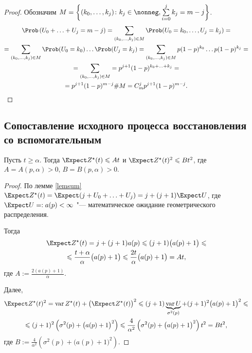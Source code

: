 \begin{proof}
   Обозначим $M = \left\{ (k_0, \ldots, k_j)\colon k_j \in \nonneg, \sum\limits_{i = 0}^j k_j = m - j\right\}$.
  \begin{multline*}
    \Prob\left( U_0 + \ldots + U_j = m - j\right) = \sum_{(k_0, \ldots, k_j) \in M} \Prob(U_0 = k_0, \ldots, U_j = k_j) =\\
    = \sum_{(k_0, \ldots, k_j) \in M} \Prob(U_0 = k_0)\ldots \Prob(U_j = k_j) = \sum_{(k_0, \ldots, k_j) \in M} p (1 - p)^{k_0}\ldots p (1 - p)^{k_j} =\\
    = \sum_{(k_0, \ldots, k_j) \in M} = p^{j + 1} (1 - p)^{k_0 + \ldots + k_j} =\\
    = p^{j + 1} (1 - p)^{m - j} \#M = C_m^j p^{j + 1} (1 - p)^{m - j}.
  \end{multline*}
\end{proof}

\subsection{Сопоставление исходного процесса восстановления со вспомогательным}

\begin{lem}\label{est}
  Пусть $t \geqslant \alpha$. Тогда $\Expect Z^\star(t) \leqslant At$ и $\Expect Z^\star(t)^2 \leqslant B t^2$, где $A = A(p, \alpha) > 0$, $B = B(p, \alpha) > 0$.
\end{lem}

\begin{proof}
  По лемме \ref{lemsum} $\Expect Z^\star(t) = \Expect(j + U_0 + \ldots + U_j) = j + (j + 1) \Expect U$, где $\Expect U =: a(p) < \infty$ "--- математическое ожидание геометрического распределения.

  Тогда
  \begin{multline*}
    \Expect Z^\star(t) = j + (j + 1) a(p) \leqslant (j + 1) \big(a(p) + 1\big) \leqslant\\
    \leqslant \frac{t + \alpha}{\alpha} \big(a(p) + 1\big) \leqslant \frac{2 t}{\alpha} \big( a(p) + 1 \big) = A t,
  \end{multline*}
  где $A := \frac{2 (a(p) + 1)}{\alpha}$.

  Далее,
  \begin{multline*}
    \Expect Z^\star(t)^2 = \var Z^\star(t) + \big(\Expect Z^\star(t) \big)^2 \leqslant (j + 1) \underbrace{\var U}_{\sigma^2(p)} + (j + 1)^2 \big( a(p) + 1 \big)^2 \leqslant\\
    \leqslant (j + 1)^2 \left( \sigma^2(p) + \big( a(p) + 1 \big)^2 \right) \leqslant \frac{4}{\alpha^2} \left( \sigma^2(p) + \big( a(p) + 1 \big)^2 \right) t^2 = B t^2,
  \end{multline*}
  где $B := \frac{4}{\alpha^2} \left( \sigma^2(p) + \big( a(p) + 1 \big)^2 \right)$.
\end{proof}

